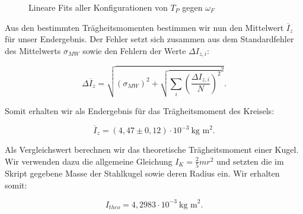 \documentclass{article}
\begin{document}
\newpage

\begin{figure}[!h]
    \centering
    \caption{Lineare Fits aller Konfigurationen von $T_P$ gegen $\omega_F$}
    \label{plt:TPvsOmega_F}
\end{figure}

\phantom{.}


Aus den bestimmten Trägheitsmomenten bestimmen wir nun den Mittelwert $\overline{I}_z$ für unser Endergebnis. Der Fehler setzt sich zusammen aus dem Standardfehler des Mittelwerts $\sigma_{MW}$ sowie den Fehlern der Werte $\Delta I_{z,i}$:

\begin{equation}
    \Delta \overline{I}_z = \sqrt{(\sigma_{MW})^2 + \sqrt{\sum_i \left( \frac{\Delta I_{z,i}}{N} \right)^2}^2}.
\end{equation}

Somit erhalten wir als Endergebnis für das Trägheitsmoment des Kreisels:

\begin{equation}
    \overline{I}_z = (4,47 \pm 0,12) \cdot 10^{-3} \ \text{kg m}^2.
\end{equation}

Als Vergleichswert berechnen wir das theoretische Trägheitsmoment einer Kugel. Wir verwenden dazu die allgemeine Gleichung $I_K = \frac{2}{5} m r^2$ und setzten die im Skript gegebene Masse der Stahlkugel sowie deren Radius ein. Wir erhalten somit:

\begin{equation}
    I_{theo} = 4,2983 \cdot 10^{-3} \ \text{kg m}^2.
\end{equation}
\end{document}
